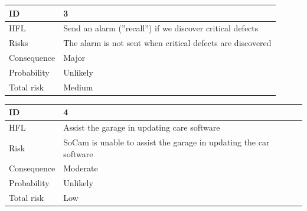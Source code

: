 
\begin{table}[H]
\centering
\begin{tabularx}{1.0\textwidth}{
    |p{}%
    |p{}|%
}
\hline

ID
& 3
\\
\hline

HFL
& Send an alarm (”recall”) if we discover critical defects
\\
\hline

Risks
& 
The alarm is not sent when critical defects are discovered
\\
\hline

Consequence
&
Major
\\
\hline

Probability
&
Unlikely
\\
\hline

Total risk
&
Medium
\\
\hline

\end{tabularx}
\end{table}


\begin{table}[H]
\centering
\begin{tabularx}{1.0\textwidth}{
    |p{}%
    |p{}|%
}
\hline

ID
& 4
\\
\hline

HFL
& Assist the garage in updating care software
\\
\hline

Risk
& 
SoCam is unable to assist the garage in updating the car software
\\
\hline

Consequence
&
Moderate
\\
\hline

Probability
&
Unlikely
\\
\hline

Total risk
&
Low
\\
\hline

\end{tabularx}
\end{table}

